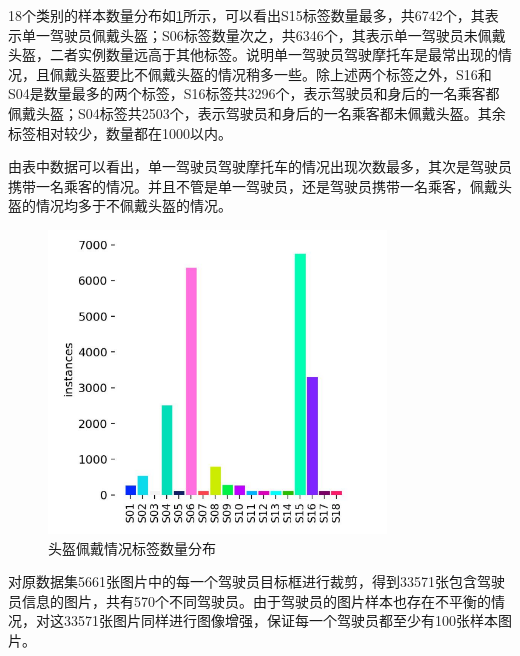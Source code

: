 18个类别的样本数量分布如\ref{fig:label1}所示，可以看出S15标签数量最多，共6742个，其表示单一驾驶员佩戴头盔；S06标签数量次之，共6346个，其表示单一驾驶员未佩戴头盔，二者实例数量远高于其他标签。说明单一驾驶员驾驶摩托车是最常出现的情况，且佩戴头盔要比不佩戴头盔的情况稍多一些。除上述两个标签之外，S16和S04是数量最多的两个标签，S16标签共3296个，表示驾驶员和身后的一名乘客都佩戴头盔；S04标签共2503个，表示驾驶员和身后的一名乘客都未佩戴头盔。其余标签相对较少，数量都在1000以内。

由表中数据可以看出，单一驾驶员驾驶摩托车的情况出现次数最多，其次是驾驶员携带一名乘客的情况。并且不管是单一驾驶员，还是驾驶员携带一名乘客，佩戴头盔的情况均多于不佩戴头盔的情况。

\begin{figure}[!htb]
    \centering
    \includegraphics[width=0.8\textwidth]{figs/chap03/label1.png}
    \caption{头盔佩戴情况标签数量分布}
    \label{fig:label1}
\end{figure}

对原数据集5661张图片中的每一个驾驶员目标框进行裁剪，得到33571张包含驾驶员信息的图片，共有570个不同驾驶员。由于驾驶员的图片样本也存在不平衡的情况，对这33571张图片同样进行图像增强，保证每一个驾驶员都至少有100张样本图片。


